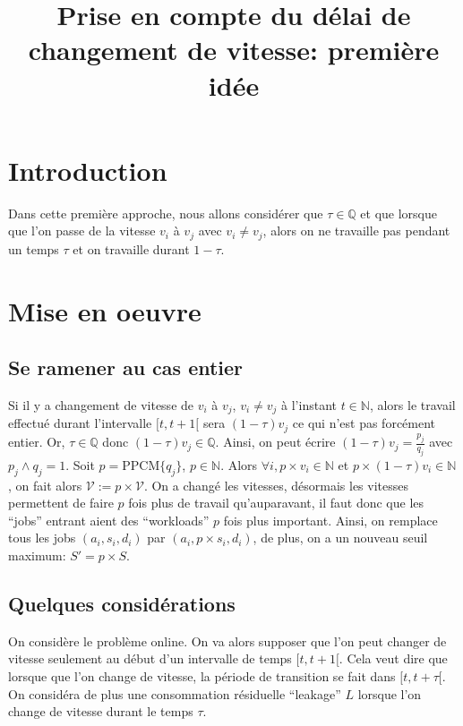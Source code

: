 \documentclass[10pt,a4paper]{article}
\title{Prise en compte du délai de changement de vitesse: première idée}
\newcommand{\Q}{\mathbb{Q}}
\newcommand{\N}{\mathbb{N}}
\newcommand{\V}{\mathcal{V}}
\begin{document}
\maketitle

\section{Introduction}

Dans cette première approche, nous allons considérer que
$\tau\in\Q$ et que lorsque que l'on passe de la vitesse $v_i$
à $v_j$ avec $v_i\neq v_j$, alors on ne travaille pas pendant un temps
$\tau$ et on travaille durant $1-\tau$.

\section{Mise en oeuvre}

\subsection{Se ramener au cas entier}

Si il y a changement de vitesse de $v_i$ à $v_j$, $v_i\neq v_j$ à
l'instant $t\in\N$, alors le travail effectué durant l'intervalle
$[t,t+1[$ sera $(1-\tau)v_j$ ce qui n'est pas forcément entier. Or,
$\tau\in\Q$ donc $(1-\tau)v_j\in\Q $. Ainsi, on peut écrire
$(1-\tau)v_j=\frac{p_j}{q_j}$ avec $p_j\wedge q_j=1$. Soit
$p=\text{PPCM}\{q_j\}$, $p\in\N$. Alors $\forall i, p\times v_i\in\N$
et $p\times(1-\tau)v_i\in\N$, on fait alors $\V:=p\times\V$. On a
changé les vitesses, désormais les vitesses permettent de faire $p$
fois plus de travail qu'auparavant, il faut donc que les ``jobs''
entrant aient des ``workloads'' $p$ fois plus important. Ainsi, on
remplace tous les jobs $(a_i,s_i,d_i)$ par $(a_i, p\times s_i, d_i)$,
de plus, on a un nouveau seuil maximum: $S'=p\times S$.
\subsection{Quelques considérations}

On considère le problème online. On va alors supposer que 
l'on peut changer de vitesse seulement au début d'un intervalle de
temps $[t,t+1[$. Cela veut dire que lorsque que l'on change de
vitesse, la période de transition se fait dans $[t,t+\tau[$. On
considéra de plus une consommation résiduelle ``leakage'' $L$ lorsque
l'on change de vitesse durant le temps $\tau$.
\end{document}
